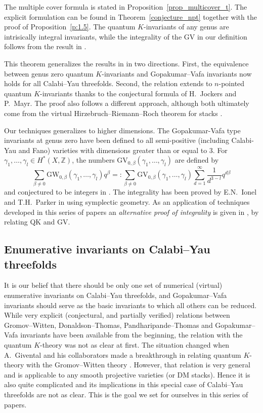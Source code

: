 \documentclass[11pt]{amsart}
\newtheorem*{main theorem*}{Main Theorem}
\theoremstyle{remark}
\numberwithin{equation}{section}
\newcommand{\GW}{{\mathrm{GW}}}
\newcommand{\GV}{{\mathrm{GV}}}
\begin{document}
The multiple cover formula is stated in Proposition~\ref{prop_multicover_t}. The explicit formulation can be found in Theorem~\ref{conjecture_npt} together with the proof of Proposition~\ref{p:1.5}. The quantum $K$-invariants of any genus are intrisically integral invariants, while the integrality of the GV in our definition follows from the result in \cite{Ionel_Parker_2018}.

This theorem generalizes the results in \cite{Chou_Lee_2022_QKGVI} in two directions. First, the equivalence between genus zero quantum $K$-invariants and Gopakumar--Vafa invariants now holds for all Calabi--Yau threefolds. Second, the relation extends to $n$-pointed quantum $K$-invariants thanks to the conjectural formula of H.~Jockers and P.~Mayr. The proof also follows a different approach, although both ultimately come from the virtual Hirzebruch--Riemann--Roch theorem for stacks \cite{Tonita_VKHRR}.

Our techniques generalizes to higher dimensions. The Gopakumar-Vafa type invariants at genus zero have been defined to all semi-positive (including Calabi-Yau and Fano) varieties with dimensions greater than or equal to $3$. For $\gamma_1,\dots, \gamma_l \in H^*(X,\mathbb{Z})$, the numbers $\GV_{0,\beta}(\gamma_1,\dots,\gamma_l)$ are defined by
\[
    \sum_{\beta \neq 0} \GW_{0,\beta}(\gamma_1,\dots,\gamma_l) q^{\beta} =: \sum_{\beta\neq 0}\GV_{0,\beta}(\gamma_1,\dots,\gamma_l) \sum_{d=1}^{\infty} \frac{1}{d^{3-l}} q^{d\beta}
\]
and conjectured to be integers in \cite{Klemm_Pandharipande_CY4_2008}. The integrality has been proved by E.N.\ Ionel and T.H.\ Parker in \cite{Ionel_Parker_2018} using symplectic geometry. As an application of techniques developed in this series of papers an \emph{alternative proof of integrality} is given in \cite{Chou_2023}, by relating QK and GV. 


\subsection{Enumerative invariants on Calabi--Yau threefolds}

It is our belief that there should be only one set of numerical (virtual) enumerative invariants on Calabi--Yau threefolds, and Gopakumar--Vafa invariants should serve as the basic invariants to which all others can be reduced. While very explicit (conjectural, and partially verified) relations between Gromov--Witten, Donaldson--Thomas, Pandharipande--Thomas and Gopakumar--Vafa invariants have been available from the beginning, the relation with the quantum $K$-theory was not as clear at first. The situation changed when A.~Givental and his collaborators made a breakthrough in relating quantum $K$-theory with the Gromov--Witten theory \cite{Givental_Tonita_2011, Givental_PEK}. However, that relation is very general and is applicable to any smooth projective varieties (or DM stacks). Hence it is also quite complicated and its implications in this special case of Calabi--Yau threefolds are not as clear. This is the goal we set for ourselves in this series of papers.
\end{document}
